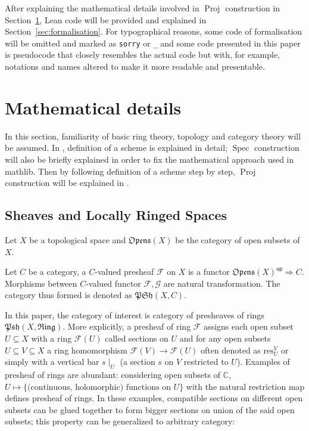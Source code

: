 \documentclass[a4paper,UKenglish,cleveref, autoref, thm-restate]{lipics-v2021}
\begin{document}
After explaining the mathematical details involved in $\operatorname{Proj}$ construction in Section~\ref{sec:maths}, Lean code will be provided and explained in Section~\ref{sec:formalisation}. For typographical reasons, some code of formalisation will be omitted and marked as \texttt{sorry} or \texttt{\_} and some code presented in this paper is pseudocode that closely resembles the actual code but with, for example, notations and names altered to make it more readable and presentable.

\section{Mathematical details}\label{sec:maths}
In this section, familiarity of basic ring theory, topology and category theory will be assumed. In , definition of a scheme is explained in detail; $\operatorname{Spec}$ construction will also be briefly explained in order to fix the mathematical approach used in \textsf{mathlib}. Then by following definition of a scheme step by step, $\operatorname{Proj}$ construction will be explained in .

\subsection{Sheaves and Locally Ringed Spaces}\label{sec:pre-def}
Let $X$ be a topological space and $\mathfrak{Opens}(X)$ be the category of open subsets of $X$.

\begin{definition} 
    Let $C$ be a category, a $C$-valued presheaf $\mathcal{F}$ on $X$ is a functor $\mathfrak{Opens}(X)^{\mathsf{op}} \Longrightarrow C$. Morphisms between $C$-valued functor $\mathcal{F, G}$ are natural transformation. The category thus formed is denoted as $\mathfrak{PSh}(X, C)$.
    \label{def:presheaf}
\end{definition}
In this paper, the category of interest is category of presheaves of rings $\mathfrak{Psh}(X, \mathfrak{Ring})$. More explicitly, a presheaf of ring $\mathcal{F}$ assigns each open subset $U \subseteq X$ with a ring $\mathcal{F}(U)$ called sections on $U$ and for any open subsets $U \subseteq V\subseteq X$ a ring homomorphism $\mathcal{F}(V)\to\mathcal{F}(U)$ often denoted as $\mathrm{res}^V_U$ or simply with a vertical bar $s\!\mid_U$ (a section $s$ on $V$ restricted to $U$). Examples of presheaf of rings are abundant: considering open subsets of $\mathbb{C}$, $U \mapsto \{\text{(continuous, holomorphic) functions on~} U\}$ with the natural restriction map defines presheaf of rings. In these examples, compatible sections on different open subsets can be glued together to form bigger sections on union of the said open subsets; this property can be generalized to arbitrary category:
\end{document}
